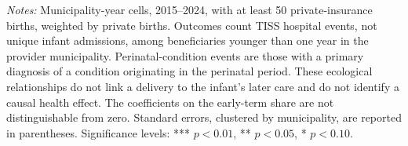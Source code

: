 
\begin{table}[H]
   \caption{\label{tab:neonatal_suggestive} \textbf{Early-term deliveries and infant hospital events}}
   \centering
\small\setlength{\tabcolsep}{5pt}
\begin{minipage}{\linewidth}\footnotesize
\textit{Notes:} Municipality-year cells, 2015--2024, with at least 50 private-insurance births, weighted by private births. Outcomes count TISS hospital events, not unique infant admissions, among beneficiaries younger than one year in the provider municipality. Perinatal-condition events are those with a primary diagnosis of a condition originating in the perinatal period. These ecological relationships do not link a delivery to the infant's later care and do not identify a causal health effect. The coefficients on the early-term share are not distinguishable from zero. Standard errors, clustered by municipality, are reported in parentheses.
\newline
\footnotesize Significance levels: *** $p<0.01$, ** $p<0.05$, * $p<0.10$.
\end{minipage}
\end{table}


